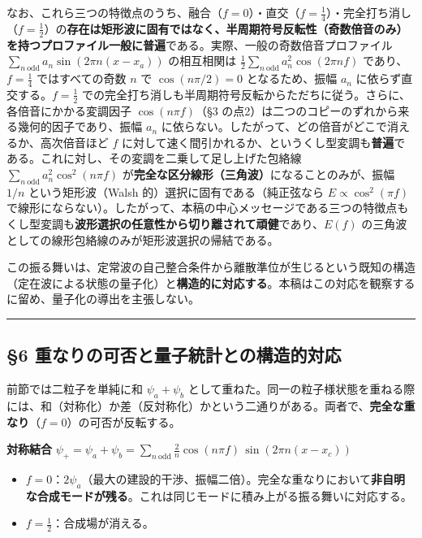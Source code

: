 \documentclass[
]{ltjsarticle}
\providecommand{\tightlist}{%
  \setlength{\itemsep}{0pt}\setlength{\parskip}{0pt}}
\begin{document}
なお、これら三つの特徴点のうち、融合（\(f=0\)）・直交（\(f=\tfrac14\)）・完全打ち消し（\(f=\tfrac12\)）の\textbf{存在は矩形波に固有ではなく、半周期符号反転性（奇数倍音のみ）を持つプロファイル一般に普遍}である。実際、一般の奇数倍音プロファイル
\(\sum_{n\ \mathrm{odd}}a_n\sin(2\pi n(x-x_a))\) の相互相関は
\(\tfrac12\sum_{n\ \mathrm{odd}}a_n^2\cos(2\pi n f)\)
であり、\(f=\tfrac14\) ではすべての奇数 \(n\) で \(\cos(n\pi/2)=0\)
となるため、振幅 \(a_n\) に依らず直交する。\(f=\tfrac12\)
での完全打ち消しも半周期符号反転からただちに従う。さらに、各倍音にかかる変調因子
\(\cos(n\pi f)\)（§3
の点2）は二つのコピーのずれから来る幾何的因子であり、振幅 \(a_n\)
に依らない。したがって、どの倍音がどこで消えるか、高次倍音ほど \(f\)
に対して速く間引かれるか、というくし型変調も\textbf{普遍}である。これに対し、その変調を二乗して足し上げた包絡線
\(\sum_{n\ \mathrm{odd}}a_n^2\cos^2(n\pi f)\)
が\textbf{完全な区分線形（三角波）}になることのみが、振幅 \(1/n\)
という矩形波（Walsh 的）選択に固有である（純正弦なら
\(E\propto\cos^2(\pi f)\)
で線形にならない）。したがって、本稿の中心メッセージである三つの特徴点もくし型変調も\textbf{波形選択の任意性から切り離されて頑健}であり、\(E(f)\)
の三角波としての線形包絡線のみが矩形波選択の帰結である。

この振る舞いは、定常波の自己整合条件から離散準位が生じるという既知の構造（定在波による状態の量子化）と\textbf{構造的に対応する}。本稿はこの対応を観察するに留め、量子化の導出を主張しない。

\begin{center}\rule{0.5\linewidth}{0.5pt}\end{center}

\subsection{§6
重なりの可否と量子統計との構造的対応}\label{ux91cdux306aux308aux306eux53efux5426ux3068ux91cfux5b50ux7d71ux8a08ux3068ux306eux69cbux9020ux7684ux5bfeux5fdc}

前節では二粒子を単純に和 \(\psi_a+\psi_b\)
として重ねた。同一の粒子様状態を重ねる際には、和（対称化）か差（反対称化）かという二通りがある。両者で、\textbf{完全な重なり}（\(f=0\)）の可否が反転する。

\textbf{対称結合}
\(\psi_{+}=\psi_a+\psi_b=\displaystyle\sum_{n\ \mathrm{odd}}\frac{2}{n}\cos(n\pi f)\,\sin(2\pi n(x-x_c))\)

\begin{itemize}
\tightlist
\item
  \(f=0\)：\(2\psi_a\)（最大の建設的干渉、振幅二倍）。完全な重なりにおいて\textbf{非自明な合成モードが残る}。これは同じモードに積み上がる振る舞いに対応する。
\item
  \(f=\tfrac12\)：合成場が消える。
\end{itemize}
\end{document}
